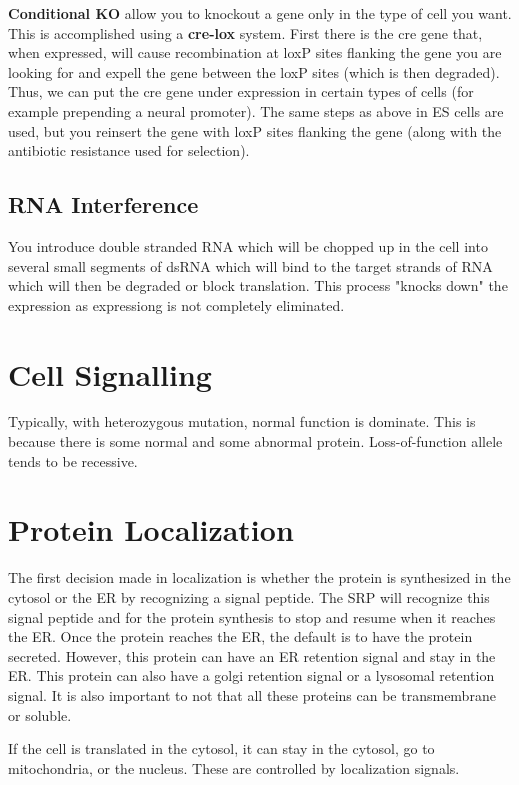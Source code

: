 \documentclass{article}
\begin{document}
\textbf{Conditional KO} allow you to knockout a gene only in the type of cell
you want. This is accomplished using a \textbf{cre-lox} system. First there is
the cre gene that, when expressed, will cause recombination at loxP sites
flanking the gene you are looking for and expell the gene between the loxP sites
(which is then degraded). Thus, we can put the cre gene under expression in
certain types of cells (for example prepending a neural promoter). The same
steps as above in ES cells are used, but you reinsert the gene with loxP sites
flanking the gene (along with the antibiotic resistance used for selection).

\subsection{RNA Interference}

You introduce double stranded RNA which will be chopped up in the cell into
several small segments of dsRNA which will bind to the target strands of RNA
which will then be degraded or block translation. This process "knocks down" the
expression as expressiong is not completely eliminated.

\section{Cell Signalling}

Typically, with heterozygous mutation, normal function is dominate. This is
because there is some normal and some abnormal protein. Loss-of-function allele
tends to be recessive.

\section{Protein Localization}

The first decision made in localization is whether the protein is synthesized in
the cytosol or the ER by recognizing a signal peptide. The SRP will recognize
this signal peptide and for the protein synthesis to stop and resume when it
reaches the ER. Once the protein reaches the ER, the default is to have the
protein secreted. However, this protein can have an ER retention signal and stay
in the ER. This protein can also have a golgi retention signal or a lysosomal
retention signal. It is also important to not that all these proteins can be
transmembrane or soluble.

If the cell is translated in the cytosol, it can stay in the cytosol, go to
mitochondria, or the nucleus. These are controlled by localization signals.
\end{document}
